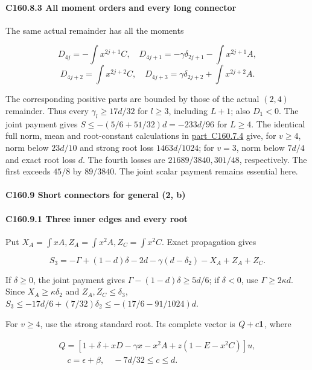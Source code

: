 \paragraph{C160.8.3 All moment orders and every long connector}

The same actual remainder has all the moments

\[
D_{4j}=-\int x^{2j+1}C,
\quad D_{4j+1}=-\gamma \delta_{2j+1}-\int x^{2j+1}A,
\]
\[
D_{4j+2}=\int x^{2j+2}C,
\quad D_{4j+3}=\gamma \delta_{2j+2}+\int x^{2j+2}A.
\]

The corresponding positive parts are bounded by those of the actual \((2,\allowbreak \allowbreak  4)\) remainder. Thus every \(\gamma_l\ge17d/32\) for \(l\ge3\), including \(L+1\); also \(D_1<0\). The joint payment gives \(S\le-(5/6+51/32)d=-233d/96\) for \(L\ge4\). The identical full norm, mean and root-constant calculations in \mbox{\hyperref[part:C160.7.4]{part C160.7.4}} give, for \(v\ge4\), norm below \(23d/10\) and strong root loss \(1463d/1024\); for \(v=3\), norm below \(7d/4\) and exact root loss \(d\). The fourth losses are \(21689/3840,\allowbreak \allowbreak  301/48\), respectively. The first exceeds \(45/8\) by \(89/3840\). The joint scalar payment remains essential here.

\paragraph{C160.9 Short connectors for general (2, b)}

\paragraph{C160.9.1 Three inner edges and every root}

Put \(X_A=\int xA,\allowbreak \allowbreak  Z_A=\int x^2A,\allowbreak \allowbreak  Z_C=\int x^2C\). Exact propagation gives

\[
S_3=-\Gamma+(1-d)\delta-2d-\gamma(d-\delta_2)-X_A+Z_A+Z_C.
\]

If \(\delta\ge0\), the joint payment gives \(\Gamma-(1-d)\delta\ge5d/6\); if \(\delta<0\), use \(\Gamma\ge2\kappa d\). Since \(X_A\ge\kappa \delta_2\) and \(Z_A,\allowbreak \allowbreak  Z_C\le \delta_3\), \(S_3\le-17d/6+(7/32)\delta_2\le-(17/6-91/1024)d\).

For \(v\ge4\), use the strong standard root. Its complete vector is \(Q+c\mathbf1\), where

\[
\begin{gathered}
Q=[1+\delta+xD-\gamma x-x^2A+z(1-E-x^2C)]u,\\
\quad c=\epsilon+\beta,\quad -7d/32\le c\le d.
\end{gathered}
\]

